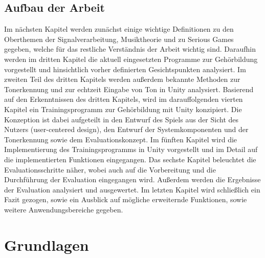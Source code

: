 \section{Aufbau der Arbeit}
Im nächsten Kapitel werden zunächst einige wichtige Definitionen zu den Oberthemen der Signalverarbeitung, Musiktheorie und zu Serious Games gegeben, welche für das restliche Verständnis der Arbeit wichtig sind. Daraufhin werden im dritten Kapitel die aktuell eingesetzten Programme zur Gehörbildung vorgestellt und hinsichtlich vorher definierten Gesichtspunkten analysiert. Im zweiten Teil des dritten Kapitels werden außerdem bekannte Methoden zur Tonerkennung und zur echtzeit Eingabe von Ton in Unity analysiert. Basierend auf den Erkenntnissen des dritten Kapitels, wird im darauffolgenden vierten Kapitel ein Trainingsprogramm zur Gehörbildung mit Unity konzipiert. Die Konzeption ist dabei aufgeteilt in den Entwurf des Spiels aus der Sicht des Nutzers (user-centered design), den Entwurf der Systemkomponenten und der Tonerkennung sowie dem Evaluationskonzept. Im fünften Kapitel wird die Implementierung des Trainingsprogramms in Unity vorgestellt und im Detail auf die implementierten Funktionen eingegangen. Das sechste Kapitel beleuchtet die Evaluationsschritte näher, wobei auch auf die Vorbereitung und die Durchführung der Evaluation eingegangen wird. Außerdem werden die Ergebnisse der Evaluation analysiert und ausgewertet. Im letzten Kapitel wird schließlich ein Fazit gezogen, sowie ein Ausblick auf mögliche erweiternde Funktionen, sowie weitere Anwendungsbereiche gegeben.



\chapter{Grundlagen}
